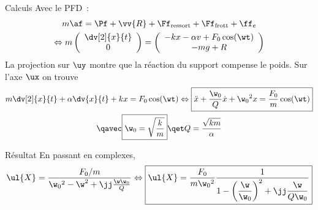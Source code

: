 \documentclass[../main/main.tex]{subfiles}
\begin{document}
\begin{rexem}{Calculs}
    Avec le PFD~:
    \begin{gather*}
        m\af = \Pf + \vv{R} + \Ff_{\rm ressort} + \Ff_{\rm frott} +\ff_e\\
        \Leftrightarrow m\left(
            \begin{array}{c}
                \dv[2]{x}{t}\\
                0
            \end{array}
        \right)
        =
        \left(
            \begin{array}{c}
                -kx -\alpha v + F_0\cos(\wt)\\
                -mg + R
            \end{array}
        \right)
    \end{gather*}
    La projection sur $\uy$ montre que la réaction du support compense le poids.
    Sur l'axe $\ux$ on trouve
    \begin{gather*}
        m \dv[2]{x}{t} + \alpha \dv{x}{t} + kx = F_0\cos(\wt)
        \Leftrightarrow
        \boxed{\ddot{x} + \frac{\w_0}{Q}\dot{x} + \w_0{}^2x =
            \frac{F_0}{m}\cos(\wt)}\\
        \qavec
        \boxed{\w_0 = \sqrt{\frac{k}{m}}}
        \qet
        Q = \frac{\sqrt{km}}{\alpha}
    \end{gather*}
\end{rexem}
\begin{rprop}{Résultat}
    En passant en complexes,
    \begin{gather*}
        \ul{X} = \frac{F_0/m}{\w_0{}^2 - \w^2 + \jj \frac{\w\w_0}{Q}}
        \Leftrightarrow
        \boxed{
        \ul{X} = \frac{F_0}{m\w_0{}^2}\frac{1}{1 -
                                    \left( \dfrac{\w}{\w_0} \right)^2 +
                                    \jj\dfrac{\w}{Q\w_0}}
                }
    \end{gather*}
\end{rprop}
\end{document}
